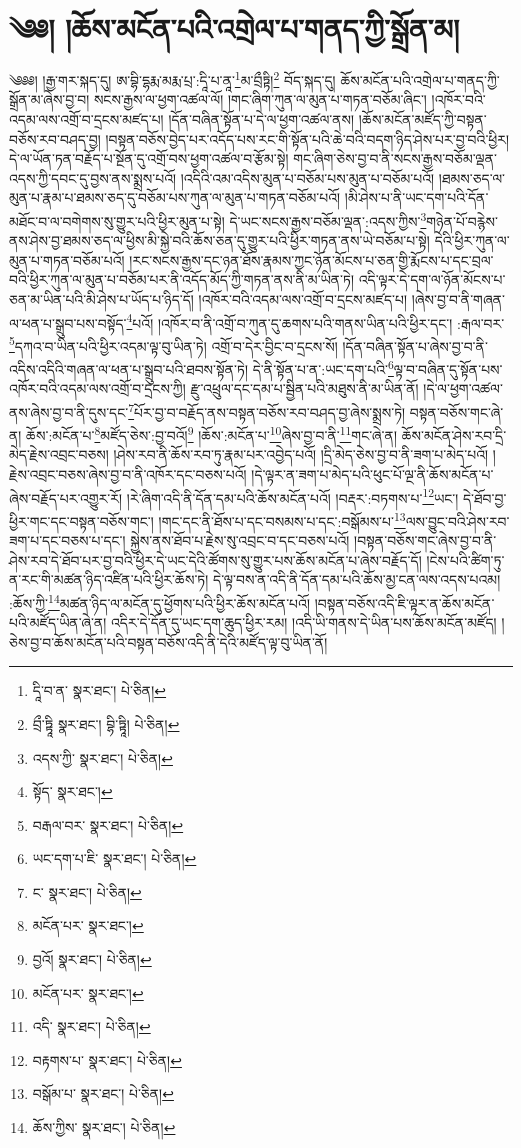 \setcounter{footnote}{0} 
\chapter{༄༅། །ཆོས་མངོན་པའི་འགྲེལ་པ་གནད་ཀྱི་སྒྲོན་མ།}༄༅༅། །རྒྱ་གར་སྐད་དུ། ཨ་བྷི་དྷརྨ་མརྨ་པྲ་:དཱི་པ་ནཱ་\footnote{དཱི་བ་ན་  སྣར་ཐང་།  པེ་ཅིན། }མ་བྲྀཏྟི།\footnote{བྲྀ་ཏྟཱི  སྣར་ཐང་། བྷི་ཏྟཱི།  པེ་ཅིན། } བོད་སྐད་དུ། ཆོས་མངོན་པའི་འགྲེལ་པ་གནད་ཀྱི་སྒྲོན་མ་ཞེས་བྱ་བ། སངས་རྒྱས་ལ་ཕྱག་འཚལ་ལོ། །གང་ཞིག་ཀུན་ལ་མུན་པ་གཏན་བཅོམ་ཞིང་། །འཁོར་བའི་འདམ་ལས་འགྲོ་བ་དྲངས་མཛད་པ། །དོན་བཞིན་སྟོན་པ་དེ་ལ་ཕྱག་འཚལ་ནས། །ཆོས་མངོན་མཛོད་ཀྱི་བསྟན་བཅོས་རབ་བཤད་བྱ། །བསྟན་བཅོས་བྱེད་པར་འདོད་པས་རང་གི་སྟོན་པའི་ཆེ་བའི་བདག་ཉིད་ཤེས་པར་བྱ་བའི་ཕྱིར། དེ་ལ་ཡོན་ཏན་བརྗོད་པ་སྔོན་དུ་འགྲོ་བས་ཕྱག་འཚལ་བ་རྩོམ་སྟེ། གང་ཞིག་ཅེས་བྱ་བ་ནི་སངས་རྒྱས་བཅོམ་ལྡན་འདས་ཀྱི་དབང་དུ་བྱས་ནས་སྨྲས་པའོ། །འདིའི་འམ་འདིས་མུན་པ་བཅོམ་པས་མུན་པ་བཅོམ་པའོ། །ཐམས་ཅད་ལ་མུན་པ་རྣམ་པ་ཐམས་ཅད་དུ་བཅོམ་པས་ཀུན་ལ་མུན་པ་གཏན་བཅོམ་པའོ། །མི་ཤེས་པ་ནི་ཡང་དག་པའི་དོན་མཐོང་བ་ལ་བགེགས་སུ་གྱུར་པའི་ཕྱིར་མུན་པ་སྟེ། དེ་ཡང་སངས་རྒྱས་བཅོམ་ལྡན་:འདས་ཀྱིས་\footnote{འདས་ཀྱི་  སྣར་ཐང་།  པེ་ཅིན། }གཉེན་པོ་བརྙེས་ནས་ཤེས་བྱ་ཐམས་ཅད་ལ་ཕྱིས་མི་སྐྱེ་བའི་ཆོས་ཅན་དུ་གྱུར་པའི་ཕྱིར་གཏན་ནས་ཡེ་བཅོམ་པ་སྟེ། དེའི་ཕྱིར་ཀུན་ལ་མུན་པ་གཏན་བཅོམ་པའོ། །རང་སངས་རྒྱས་དང་ཉན་ཐོས་རྣམས་ཀྱང་ཉོན་མོངས་པ་ཅན་གྱི་རྨོངས་པ་དང་བྲལ་བའི་ཕྱིར་ཀུན་ལ་མུན་པ་བཅོམ་པར་ནི་འདོད་མོད་ཀྱི་གཏན་ནས་ནི་མ་ཡིན་ཏེ། འདི་ལྟར་དེ་དག་ལ་ཉོན་མོངས་པ་ཅན་མ་ཡིན་པའི་མི་ཤེས་པ་ཡོད་པ་ཉིད་དོ། །འཁོར་བའི་འདམ་ལས་འགྲོ་བ་དྲངས་མཛད་པ། །ཞེས་བྱ་བ་ནི་གཞན་ལ་ཕན་པ་སྒྲུབ་པས་བསྟོད་\footnote{སྟོད་  སྣར་ཐང་། }པའོ། །འཁོར་བ་ནི་འགྲོ་བ་ཀུན་དུ་ཆགས་པའི་གནས་ཡིན་པའི་ཕྱིར་དང་། :རྒལ་བར་\footnote{བརྒལ་བར་  སྣར་ཐང་།  པེ་ཅིན། }དཀའ་བ་ཡིན་པའི་ཕྱིར་འདམ་ལྟ་བུ་ཡིན་ཏེ། འགྲོ་བ་དེར་བྱིང་བ་དྲངས་སོ། །དོན་བཞིན་སྟོན་པ་ཞེས་བྱ་བ་ནི་འདིས་འདིའི་གཞན་ལ་ཕན་པ་སྒྲུབ་པའི་ཐབས་སྟོན་ཏེ། དེ་ནི་སྟོན་པ་ན་:ཡང་དག་པའི་\footnote{ཡང་དག་པ་ཇི་  སྣར་ཐང་།  པེ་ཅིན། }ལྟ་བ་བཞིན་དུ་སྟོན་པས་འཁོར་བའི་འདམ་ལས་འགྲོ་བ་དྲངས་ཀྱི། རྫུ་འཕྲུལ་དང་དམ་པ་སྦྱིན་པའི་མཐུས་ནི་མ་ཡིན་ནོ། །དེ་ལ་ཕྱག་འཚལ་ནས་ཞེས་བྱ་བ་ནི་དུས་དང་\footnote{ང་  སྣར་ཐང་།  པེ་ཅིན། }པོར་བྱ་བ་བརྗོད་ནས་བསྟན་བཅོས་རབ་བཤད་བྱ་ཞེས་སྨྲས་ཏེ། བསྟན་བཅོས་གང་ཞེ་ན། ཆོས་:མངོན་པ་\footnote{མངོན་པར་  སྣར་ཐང་། }མཛོད་ཅེས་:བྱ་བའོ།\footnote{བྱའོ།  སྣར་ཐང་།  པེ་ཅིན། } །ཆོས་:མངོན་པ་\footnote{མངོན་པར་  སྣར་ཐང་། }ཞེས་བྱ་བ་ནི་\footnote{འདི་  སྣར་ཐང་།  པེ་ཅིན། }གང་ཞེ་ན། ཆོས་མངོན་ཤེས་རབ་དྲི་མེད་རྗེས་འབྲང་བཅས། །ཤེས་རབ་ནི་ཆོས་རབ་ཏུ་རྣམ་པར་འབྱེད་པའོ། །དྲི་མེད་ཅེས་བྱ་བ་ནི་ཟག་པ་མེད་པའོ། །རྗེས་འབྲང་བཅས་ཞེས་བྱ་བ་ནི་འཁོར་དང་བཅས་པའོ། །དེ་ལྟར་ན་ཟག་པ་མེད་པའི་ཕུང་པོ་ལྔ་ནི་ཆོས་མངོན་པ་ཞེས་བརྗོད་པར་འགྱུར་རོ། །རེ་ཞིག་འདི་ནི་དོན་དམ་པའི་ཆོས་མངོན་པའོ། །བརྡར་:བཏགས་པ་\footnote{བརྟགས་པ་  སྣར་ཐང་།  པེ་ཅིན། }ཡང་། དེ་ཐོབ་བྱ་ཕྱིར་གང་དང་བསྟན་བཅོས་གང་། །གང་དང་ནི་ཐོས་པ་དང་བསམས་པ་དང་:བསྒོམས་པ་\footnote{བསྒོམ་པ་  སྣར་ཐང་།  པེ་ཅིན། }ལས་བྱུང་བའི་ཤེས་རབ་ཟག་པ་དང་བཅས་པ་དང་། སྐྱེས་ནས་ཐོབ་པ་རྗེས་སུ་འབྲང་བ་དང་བཅས་པའོ། །བསྟན་བཅོས་གང་ཞེས་བྱ་བ་ནི་ཤེས་རབ་དེ་ཐོབ་པར་བྱ་བའི་ཕྱིར་དེ་ཡང་དེའི་ཚོགས་སུ་གྱུར་པས་ཆོས་མངོན་པ་ཞེས་བརྗོད་དོ། །ངེས་པའི་ཚིག་ཏུ་ན་རང་གི་མཚན་ཉིད་འཛིན་པའི་ཕྱིར་ཆོས་ཏེ། དེ་ལྟ་བས་ན་འདི་ནི་དོན་དམ་པའི་ཆོས་མྱ་ངན་ལས་འདས་པའམ། :ཆོས་ཀྱི་\footnote{ཆོས་ཀྱིས་  སྣར་ཐང་།  པེ་ཅིན། }མཚན་ཉིད་ལ་མངོན་དུ་ཕྱོགས་པའི་ཕྱིར་ཆོས་མངོན་པའོ། །བསྟན་བཅོས་འདི་ཇི་ལྟར་ན་ཆོས་མངོན་པའི་མཛོད་ཡིན་ཞེ་ན། འདིར་དེ་དོན་དུ་ཡང་དག་ཆུད་ཕྱིར་རམ། །འདི་ཡི་གནས་དེ་ཡིན་པས་ཆོས་མངོན་མཛོད། །ཅེས་བྱ་བ་ཆོས་མངོན་པའི་བསྟན་བཅོས་འདི་ནི་དེའི་མཛོད་ལྟ་བུ་ཡིན་ནོ། 